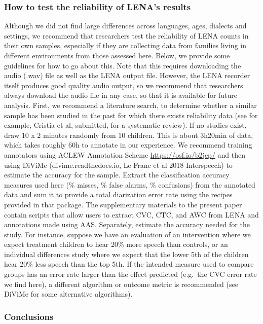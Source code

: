 \documentclass[english,floatsintext,man]{apa6}
\begin{document}
\subsubsection{How to test the reliability of LENA's
results}\label{how-to-test-the-reliability-of-lenas-results}

Although we did not find large differences across languages, ages,
dialects and settings, we recommend that researchers test the
reliability of LENA counts in their own samples, especially if they are
collecting data from families living in different environments from
those assessed here. Below, we provide some guidelines for how to go
about this. Note that this requires downloading the audio (.wav) file as
well as the LENA output file. However, the LENA recorder itself produces
good quality audio output, so we recommend that researchers always
download the audio file in any case, so that it is available for future
analysis. First, we recommend a literature search, to determine whether
a similar sample has been studied in the past for which there exists
reliability data (see for example, Cristia et al, submitted, for a
systematic review). If no studies exist, draw 10 x 2 minutes randomly
from 10 children. This is about 3h20min of data, which takes roughly 60h
to annotate in our experience. We recommend training annotators using
ACLEW Annotation Scheme \url{https://osf.io/b2jep/} and then using
DiViMe (divime.readthedocs.io, Le Franc et al 2018 Interspeech) to
estimate the accuracy for the sample. Extract the classification
accuracy measures used here (\% misses, \% false alarms, \% confusions)
from the annotated data and sum it to provide a total diarization error
rate using the recipes provided in that package. The supplementary
materials to the present paper contain scripts that allow users to
extract CVC, CTC, and AWC from LENA and annotations made using AAS.
Separately, estimate the accuracy needed for the study. For instance,
suppose we have an evaluation of an intervention where we expect
treatment children to hear 20\% more speech than controls, or an
individual differences study where we expect that the lower 5th of the
children hear 20\% less speech than the top 5th. If the intended measure
used to compare groups has an error rate larger than the effect
predicted (e.g.~the CVC error rate we find here), a different algorithm
or outcome metric is recommended (see DiViMe for some alternative
algorithms).

\subsubsection{Conclusions}\label{conclusions}
\end{document}
